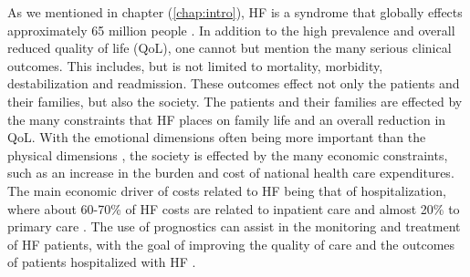 \documentclass[../thesis.tex]{subfiles}
\begin{document}
\noindent As we mentioned in chapter (\ref{chap:intro}), HF is a syndrome that globally effects approximately 65 million people \citep{hay2017global}. In addition to the high prevalence and overall reduced quality of life (QoL), one cannot but mention the many serious clinical outcomes. This includes, but is not limited to mortality, morbidity, destabilization and readmission. These outcomes effect not only the patients and their families, but also the society. The patients and their families are effected by the many constraints that HF places on family life and an overall reduction in QoL. With the emotional dimensions often being more important than the physical dimensions \citep{dunderdale2005quality}, the society is effected by the many economic constraints, such as an increase in the burden and cost of national health care expenditures. The main economic driver of costs related to HF being that of hospitalization, where about 60-70\% of HF costs are related to inpatient care and almost 20\% to primary care \citep{braunwald2015war}. The use of prognostics can assist in the monitoring and treatment of HF patients, with the goal of improving the quality of care and the outcomes of patients hospitalized with HF 
\citep{tripoliti2017heart}.\\
\end{document}
